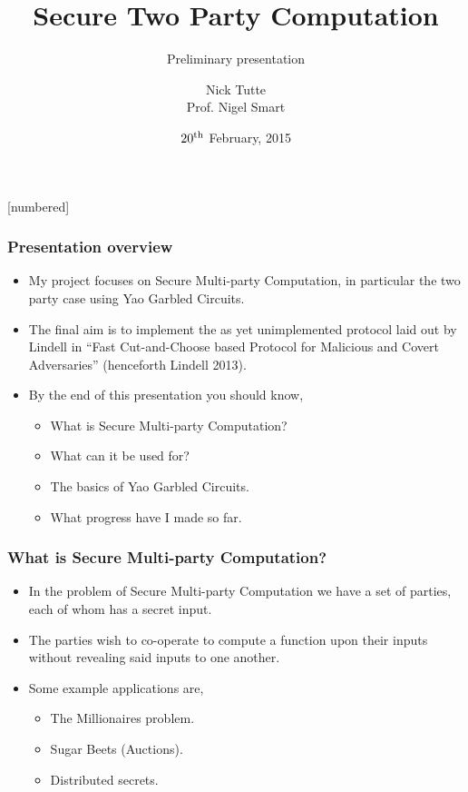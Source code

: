 \documentclass{beamer}
\begin{document}
	\title[titleS2C]{Secure Two Party Computation}
	\subtitle{Preliminary presentation}
	\author[Author]{Nick Tutte\\[1ex]{\tiny Prof. Nigel Smart}}
	\date[theDate]
	{$20^{\textnormal{th}}$ February, 2015}
	\subject{Computer Science}
	\frame{\titlepage}
	[numbered]


	\begin{frame}
		\frametitle{Presentation overview}
		\begin{itemize}
			\item My project focuses on Secure Multi-party Computation, in particular the two party case using Yao Garbled Circuits.
			\item The final aim is to implement the as yet unimplemented protocol laid out by Lindell in ``Fast Cut-and-Choose based Protocol for Malicious and Covert Adversaries'' (henceforth Lindell 2013).

			\item By the end of this presentation you should know,
			\begin{itemize}
				\item What is Secure Multi-party Computation?
				\item What can it be used for?
				\item The basics of Yao Garbled Circuits.
				\item What progress have I made so far.
			\end{itemize}
		\end{itemize}

	\end{frame}


	\begin{frame}
		\frametitle{What is Secure Multi-party Computation?}
		
		\begin{itemize}
			\item In the problem of Secure Multi-party Computation we have a set of parties, each of whom has a secret input.
			\item The parties wish to co-operate to compute a function upon their inputs without revealing said inputs to one another.
			\item Some example applications are,
			\begin{itemize}
				\item The Millionaires problem.
				\item Sugar Beets (Auctions).
				\item Distributed secrets.
			\end{itemize}
		\end{itemize}
	\end{frame}
\end{document}
